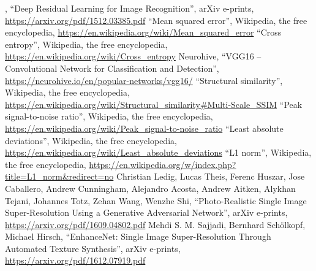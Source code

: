 \documentclass[conference]{IEEEtran}
\begin{document}
\begin{thebibliography}{30}
		, ``Deep Residual Learning for Image Recognition'', arXiv e-prints, \url{https://arxiv.org/pdf/1512.03385.pdf}
		 ``Mean squared error'', Wikipedia, the free encyclopedia, \url{https://en.wikipedia.org/wiki/Mean_squared_error}
		 ``Cross entropy'', Wikipedia, the free encyclopedia, \url{https://en.wikipedia.org/wiki/Cross_entropy}
		 Neurohive, ``VGG16 – Convolutional Network for Classification and Detection'', \url{https://neurohive.io/en/popular-networks/vgg16/}
		 ``Structural similarity'', Wikipedia, the free encyclopedia, \url{https://en.wikipedia.org/wiki/Structural_similarity#Multi-Scale_SSIM}
		 ``Peak signal-to-noise ratio'', Wikipedia, the free encyclopedia, \url{https://en.wikipedia.org/wiki/Peak_signal-to-noise_ratio}
		 ``Least absolute deviations'', Wikipedia, the free encyclopedia, \url{https://en.wikipedia.org/wiki/Least_absolute_deviations}
		 ``L1 norm'', Wikipedia, the free encyclopedia, \url{https://en.wikipedia.org/w/index.php?title=L1_norm&redirect=no}
		 Christian Ledig, Lucas Theis, Ferenc Huszar, Jose Caballero, Andrew Cunningham, Alejandro Acosta, Andrew Aitken, Alykhan Tejani, Johannes Totz, Zehan Wang, Wenzhe Shi, ``Photo-Realistic Single Image Super-Resolution Using a Generative Adversarial Network'', arXiv e-prints, \url{https://arxiv.org/pdf/1609.04802.pdf}
		 Mehdi S. M. Sajjadi, Bernhard Schölkopf, Michael Hirsch, ``EnhanceNet: Single Image Super-Resolution Through Automated Texture Synthesis'', arXiv e-prints, \url{https://arxiv.org/pdf/1612.07919.pdf}
	\end{thebibliography}
	
	
\end{document}
